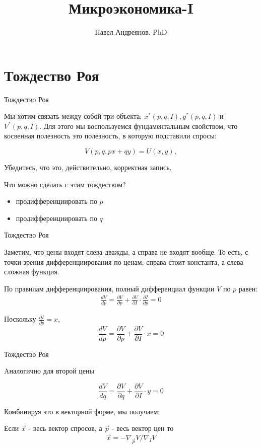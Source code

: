 \documentclass{beamer}
\title{
Микроэкономика-I
}
\author{
Павел Андреянов, PhD
}
\begin{document}
\maketitle

\section{Тождество Роя}

\begin{frame}{Тождество Роя}

Мы хотим связать между собой три объекта: $x^{\ast}(p,q,I), y^{\ast}(p,q,I)$ и  $V^{\ast}(p,q,I)$. Для этого мы воспользуемся фундаментальным свойством, что косвенная полезность это полезность, в которую подставили спросы:

$$V(p, q, px + qy) = U(x, y),$$

Убедитесь, что это, действительно, корректная запись.

Что можно сделать с этим тождеством?
\begin{itemize}
\item продифференциировать по $p$
\item продифференциировать по $q$
\end{itemize}

\end{frame}


\begin{frame}{Тождество Роя}

Заметим, что цены входят слева дважды, а справа не входят вообще. То есть, с точки зрения дифференциирования по ценам, справа стоит константа, а слева сложная функция. 

По правилам дифференциирования, полный дифференциал функции $V$ по $p$ равен:
\begin{gather*}
\frac{d V}{d p} = \frac{\partial V}{\partial p} + \frac{\partial V}{\partial I} \cdot \frac{\partial I}{\partial p} = 0
\end{gather*}

Поскольку $\frac{\partial I}{\partial p} = x$, 
$$\frac{d V}{d p} = \frac{\partial V}{\partial p} + \frac{\partial V}{\partial I} \cdot x = 0$$

\end{frame}

\begin{frame}{Тождество Роя}

Aналогично для второй цены

$$\frac{d V}{d q} = \frac{\partial V}{\partial q} + \frac{\partial V}{\partial I} \cdot y = 0$$

Комбинируя это в векторной форме, мы получаем:

\begin{theorem}
Если $\vec{x}$ - весь вектор спросов, а $\vec{p}$ - весь вектор цен то
$$\vec{x} = - \nabla_{\vec{p}} V / \nabla_I V$$
\end{theorem}

\end{frame}
\end{document}
